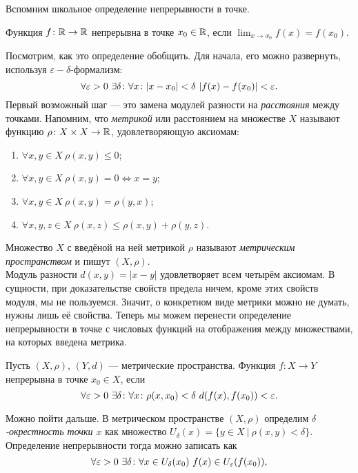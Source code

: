 Вспомним школьное определение непрерывности в точке.
\begin{defin}
	Функция $f\colon\mathbb {R}\to\mathbb {R}$ непрерывна в точке $x_0\in\mathbb {R}$, если $\displaystyle\lim_{x\to x_0} f(x)=f(x_0)$.
\end{defin}
Посмотрим, как это определение обобщить. Для начала, его можно развернуть, используя $\varepsilon-\delta$-формализм:
\begin{equation}
	\forall\varepsilon>0\ \exists\delta\such\forall x\such |x-x_0|<\delta\ |f(x)-f(x_0)|<\varepsilon.
\end{equation}
Первый возможный шаг --- это замена модулей разности на \textit{расстояния} между точками. Напомним, что \textit{метрикой} или расстоянием на множестве $X$ называют функцию $\rho\colon X\times X\to\mathbb {R}$, удовлетворяющую аксиомам:
\begin{enumerate}
	\item $\forall x,y\in X\ \rho(x,y)\leqslant 0$;
	\item $\forall x,y\in X\ \rho(x,y)=0\Leftrightarrow x=y$;
	\item $\forall x,y\in X\ \rho(x,y)=\rho(y,x)$;
	\item $\forall x,y,z\in X\ \rho(x,z)\leqslant\rho(x,y)+\rho(y,z)$.
\end{enumerate}
Множество $X$ с введёной на ней метрикой $\rho$ называют \textit{метрическим пространством} и пишут $(X,\rho)$.\\
Модуль разности $d(x,y)=|x-y|$ удовлетворяет всем четырём аксиомам. В сущности, при доказательстве свойств предела ничем, кроме этих свойств модуля, мы не пользуемся. Значит, о конкретном виде метрики можно не думать, нужны лишь её свойства. Теперь мы можем перенести определение непрерывности в точке с числовых функций на отображения между множествами, на которых введена метрика.
\begin{defin}
	Пусть $(X,\rho)$, $(Y,d)$ --- метрические пространства. Функция $f\colon X\to Y$ непрерывна в точке $x_0\in X$, если
	\begin{equation}
		\forall\varepsilon>0\ \exists\delta\such\forall x\such \rho(x,x_0)<\delta\ d(f(x),f(x_0))<\varepsilon.
	\end{equation}
\end{defin}
Можно пойти дальше. В метрическом пространстве $(X,\rho)$ определим \textit{$\delta$-окрестность точки $x$} как множество $U_{\delta}(x)=\{y\in X\ |\ \rho(x,y)<\delta\}$. Определение непрерывности тогда можно записать как
	\begin{equation}
		\forall\varepsilon>0\ \exists\delta\such\forall x\in U_{\delta}(x_0)\ f(x)\in U_{\varepsilon}(f(x_0)),
	\end{equation}
